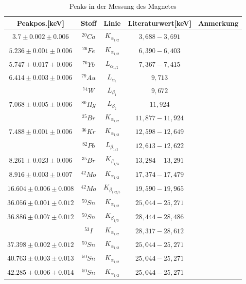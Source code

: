 \documentclass[12pt,a4paper]{article}
\begin{document}
\begin{table}[H]
\center
\begin{tabular}{|c|c|c|c|c|}
\hline 
Peakpos.[keV] & Stoff & Linie & Literaturwert[keV] & Anmerkung \\
\hline 
$3.7 \pm 0.002 \pm 0.006$& $^{20}Ca$ & $K_{\alpha_{1/2}}$ & $3,688-3,691$ & \\
\hline 
$5.236 \pm 0.001 \pm 0.006$ & $^{26}Fe$ & $K_{\alpha_{1/2}}$ & $6,390-6,403$ & \\ 
\hline 
$5.747 \pm 0.017 \pm 0.006$ & $^{70}Yb$ & $L_{\alpha_{1/2}}$ & $7,367-7,415$ & \\
\hline
$6.414 \pm 0.003 \pm 0.006$ & $^{79}Au$ & $L_{\alpha_{1}}$ & $9,713$ & \\
& $^{74}W$ & $L_{\beta_{1}}$ & $9,672$ & \\
\hline
$7.068 \pm 0.005 \pm 0.006$ & $^{80}Hg$ & $L_{\beta_{2}}$ & $11,924$ & \\
& $^{35}Br$ & $K_{\alpha_{1/2}}$ & $11,877-11,924$ & \\
\hline
$7.488 \pm 0.001 \pm 0.006$ & $^{36}Kr$ & $K_{\alpha_{1/2}}$ & $12,598-12,649$ & \\
& $^{82}Pb$ & $L_{\beta_{1/2}}$ & $12,613-12,622$ & \\
\hline
$8.261 \pm 0.023 \pm 0.006$ & $^{35}Br$ & $K_{\beta_{1/3}}$ & $13,284-13,291$ & \\
\hline
$8.916 \pm 0.003 \pm 0.007$ & $^{42}Mo$ & $K_{\alpha_{1/2}}$ & $17,374-17,479$ & \\
\hline
$16.604 \pm 0.006 \pm 0.008$ & $^{42}Mo$ & $K_{\beta_{1/2/3}}$ & $19,590-19,965$ & \\
\hline
$36.056 \pm 0.001 \pm 0.012$ & $^{50}Sn$ & $K_{\alpha_{1/2}}$ & $25,044-25,271$ & \\
\hline
$36.886 \pm 0.007 \pm 0.012$ & $^{50}Sn$ & $K_{\beta_{1/3}}$ & $28,444-28,486$ & \\
& $^{53}I$ & $K_{\alpha_{1/2}}$ & $28,317-28,612$ & \\
\hline
$37.398 \pm 0.002 \pm 0.012$ & $^{50}Sn$ & $K_{\alpha_{1/2}}$ & $25,044-25,271$ & \\
\hline
$40.763 \pm 0.003 \pm 0.013$ & $^{50}Sn$ & $K_{\alpha_{1/2}}$ & $25,044-25,271$ & \\
\hline
$42.285 \pm 0.006 \pm 0.014$ & $^{50}Sn$ & $K_{\alpha_{1/2}}$ & $25,044-25,271$ & \\
\hline
\end{tabular} 
\caption{Peaks in der Messung des Magnetes}
\label{prop_magnet}
\end{table}
\newpage
\end{document}
